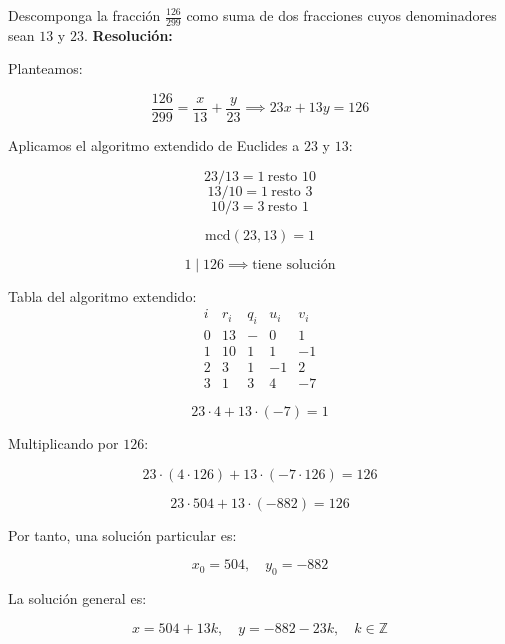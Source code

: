 \documentclass[a4paper,12pt]{article}
\begin{document}
\begin{ejercicio}[title=Ejercicio 11]
Descomponga la fracción 
$
\frac{126}{299}
$ 
como suma de dos fracciones cuyos denominadores sean $13$ y $23$.
\tcblower
\textbf{Resolución:}

Planteamos:

\[
\frac{126}{299} = \boxed{\frac{x}{13} + \frac{y}{23}} \implies 23x + 13y = 126
\]

\vspace{0.5em}

Aplicamos el algoritmo extendido de Euclides a $23$ y $13$:

\[
23 / 13 = 1 \ \text{resto } 10
\]
\[
13 / 10 = 1 \ \text{resto } 3
\]
\[
10 / 3 = 3 \ \text{resto } \boxed{1}
\]

\[
\text{mcd}(23,13) = \boxed{1}
\]

\[
1 \mid 126 \implies \text{tiene solución}
\]

\vspace{0.5em}

Tabla del algoritmo extendido:
\[
\begin{array}{c|c|c|c|c}
i & r_i & q_i & u_i & v_i\\
\hline
0 & 13 & - & 0 & 1\\
1 & 10 & 1 & 1 & -1\\
2 & 3 & 1 & -1 & 2\\
3 & \boxed{1} & 3 & 4 & -7
\end{array}
\]

\[
23 \cdot 4 + 13 \cdot (-7) = 1
\]

Multiplicando por $126$:

\[
23 \cdot (4 \cdot 126) + 13 \cdot (-7 \cdot 126) = 126
\]

\[
23 \cdot 504 + 13 \cdot (-882) = 126
\]

Por tanto, una solución particular es:

\[
x_0 = 504, \quad y_0 = -882
\]

La solución general es:

\[
x = 504 + 13k, \quad y = -882 - 23k, \quad k \in \mathbb{Z}
\]
\end{ejercicio}
\end{document}
